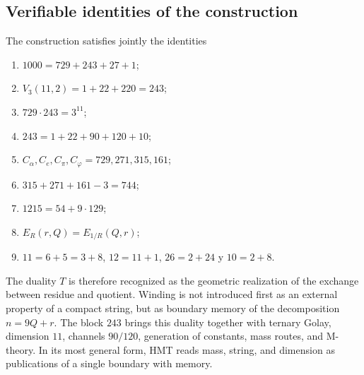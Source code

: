 \subsection{Verifiable identities of the construction}

The construction satisfies jointly the identities
\begin{enumerate}
\item \(1000=729+243+27+1\);
\item \(V_3(11,2)=1+22+220=243\);
\item \(729\cdot243=3^{11}\);
\item \(243=1+22+90+120+10\);
\item \(C_\alpha,C_e,C_\pi,C_\varphi=729,271,315,161\);
\item \(315+271+161-3=744\);
\item \(1215=54+9\cdot129\);
\item \(E_R(r,Q)=E_{1/R}(Q,r)\);
\item \(11=6+5=3+8\), \(12=11+1\), \(26=2+24\) y \(10=2+8\).
\end{enumerate}

The duality \(T\) is therefore recognized as the geometric realization of the
exchange between residue and quotient. Winding is not introduced
first as an external property of a compact string, but as boundary memory of
the decomposition \(n=9Q+r\). The block \(243\) brings this
duality together with ternary Golay, dimension \(11\), channels \(90/120\), generation
of constants, mass routes, and M-theory. In its most general form, HMT reads
mass, string, and dimension as publications of a single boundary with
memory.
